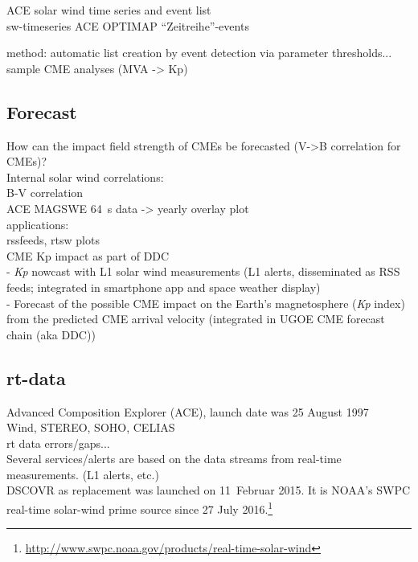 ACE solar wind time series and event list\\
sw-timeseries ACE OPTIMAP ``Zeitreihe''-events

method: automatic list creation by event detection via parameter thresholds...\\

sample CME analyses (MVA -> Kp)\\


\subsection{Forecast}
How can the impact field strength of CMEs be forecasted (V->B correlation for CMEs)?\\
Internal solar wind correlations:\\
B-V correlation\\
ACE MAGSWE 64~s data -> yearly overlay plot\\

applications:\\
rssfeeds, rtsw plots\\
CME Kp impact as part of DDC\\
- \textit{Kp} nowcast with L1 solar wind measurements (L1 alerts, disseminated as RSS feeds; integrated in smartphone app and space weather display)\\
- Forecast of the possible CME impact on the Earth's magnetosphere (\textit{Kp} index) from the predicted CME arrival velocity (integrated in UGOE CME forecast chain (aka DDC))\\

\subsection{rt-data}
Advanced Composition Explorer (ACE), launch date was 25 August 1997\\
Wind, STEREO, SOHO, CELIAS\\
rt data errors/gaps...\\
Several services/alerts are based on the data streams from real-time measurements. (L1 alerts, etc.)\\
DSCOVR as replacement was launched on 11~Februar 2015. It is NOAA's SWPC real-time solar-wind prime source since 27 July 2016.\footnote{\url{http://www.swpc.noaa.gov/products/real-time-solar-wind}}\\



